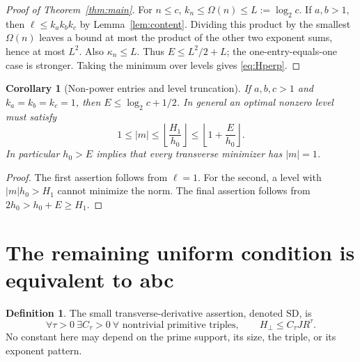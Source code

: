 \documentclass[11pt]{article}
\newtheorem{corollary}[theorem]{Corollary}
\theoremstyle{definition}
\newtheorem{definition}[theorem]{Definition}
\theoremstyle{remark}
\newcommand{\Om}{\Omega}
\begin{document}
\begin{proof}[Proof of Theorem~\ref{thm:main}]
For $n\le c$, $k_n\le\Om(n)\le L:=\log_2c$. If $a,b>1$, then $\ell\le k_a k_b k_c$ by Lemma~\ref{lem:content}. Dividing this product by the smallest $\Om(n)$ leaves a bound at most the product of the other two exponent sums, hence at most $L^2$. Also $\kappa_n\le L$. Thus $E\le L^2/2+L$; the one-entry-equals-one case is stronger. Taking the minimum over levels gives \eqref{eq:Hperp}.
\end{proof}

\begin{corollary}[Non-power entries and level truncation]\label{cor:truncate}
If $a,b,c>1$ and $k_a=k_b=k_c=1$, then $E\le\log_2c+1/2$. In general an optimal nonzero level must satisfy
\[
 1\le |m|\le\left\lfloor\frac{H_1}{h_0}\right\rfloor
 \le\left\lfloor1+\frac E{h_0}\right\rfloor.
\]
In particular $h_0>E$ implies that every transverse minimizer has $|m|=1$.
\end{corollary}
\begin{proof}
The first assertion follows from $\ell=1$. For the second, a level with $|m|h_0>H_1$ cannot minimize the norm. The final assertion follows from $2h_0>h_0+E\ge H_1$.
\end{proof}

\section{The remaining uniform condition is equivalent to abc}\label{sec:equivalence}
\begin{definition}
The small transverse-derivative assertion, denoted $\mathrm{SD}$, is
\[
 \forall\tau>0\ \exists C_\tau>0\ \forall\text{ nontrivial primitive triples},
 \qquad H_\perp\le C_\tau J R^\tau.
\]
No constant here may depend on the prime support, its size, the triple, or its exponent pattern.
\end{definition}
\end{document}
